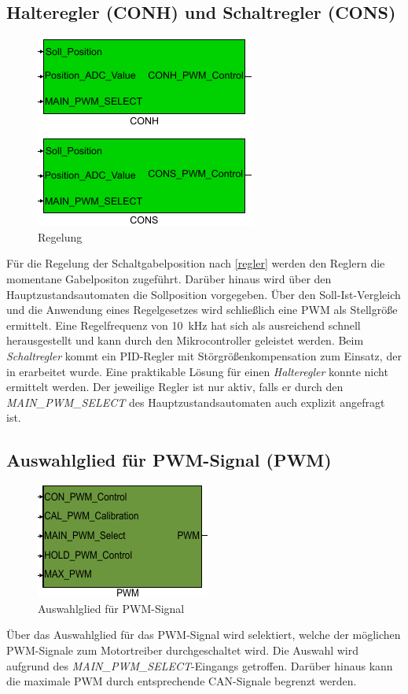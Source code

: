 \subsection{Halteregler (CONH) und Schaltregler (CONS)}

\begin{figure}[H]%
\centering
\includegraphics[width=0.2\columnwidth]{./Bilder/fig_conh_cons}%
\caption{Regelung}%
\label{fig_conh_cons}%
\end{figure}

Für die Regelung der Schaltgabelposition nach \autoref{regler} werden den Reglern die momentane Gabelpositon zugeführt. Darüber hinaus wird über den Hauptzustandsautomaten die Sollposition vorgegeben. Über den Soll-Ist-Vergleich und die Anwendung eines Regelgesetzes wird schließlich eine PWM als Stellgröße ermittelt. Eine Regelfrequenz von \SI{10}{kHz} hat sich als ausreichend schnell herausgestellt und kann durch den Mikrocontroller geleistet werden. Beim \textit{Schaltregler} kommt ein PID-Regler mit Störgrößenkompensation zum Einsatz, der in \cite{vADP} erarbeitet wurde. Eine praktikable Lösung für einen \textit{Halteregler} konnte nicht ermittelt werden. Der jeweilige Regler ist nur aktiv, falls er durch den \textit{MAIN\_PWM\_SELECT} des Hauptzustandsautomaten auch explizit angefragt ist.
 
\subsection{Auswahlglied für PWM-Signal (PWM)}

\begin{figure}[H]%
\centering
\includegraphics[width=0.2\columnwidth]{./Bilder/fig_pwm}%
\caption{Auswahlglied für PWM-Signal}%
\label{fig_pwm}%
\end{figure}

Über das Auswahlglied für das PWM-Signal wird selektiert, welche der möglichen PWM-Signale zum Motortreiber durchgeschaltet wird. Die Auswahl wird aufgrund des \textit{MAIN\_PWM\_SELECT}-Eingangs getroffen. Darüber hinaus kann die maximale PWM durch entsprechende CAN-Signale begrenzt werden. 

